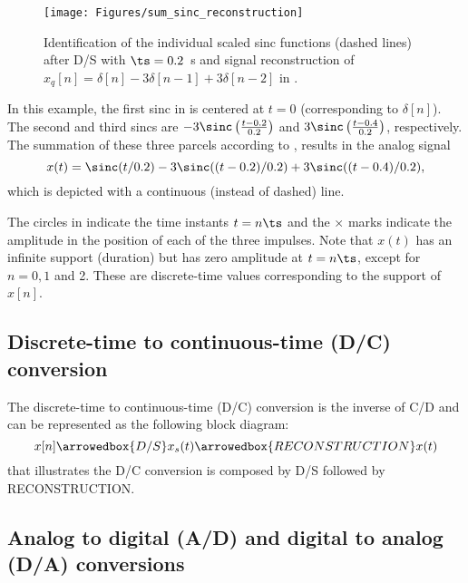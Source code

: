 \begin{figure}
	\centering
		\texttt{[image: Figures/sum\_sinc\_reconstruction]}
	\caption{Identification of the individual scaled sinc functions (dashed lines) after D/S with $\ts=0.2$~s and signal reconstruction of $x_q[n]=\delta[n]-3\delta[n-1]+3\delta[n-2]$ in .\label{fig:sum_sinc_reconstruction}}
\end{figure}

In this example, the first sinc in  is centered at $t=0$ (corresponding to $\delta[n]$). The second and third sincs
 are $-3\sinc \left( \frac{t-0.2}{0.2}\right)$ and $3\sinc \left( \frac{t-0.4}{0.2}\right)$, respectively. The summation of these three parcels according to , results in the analog signal 
\begin{equation}
x(t) = \sinc(t/0.2) - 3\sinc((t-0.2)/0.2) + 3 \sinc((t-0.4)/0.2),
\label{eq:three_sincs}
\end{equation}
which is depicted with a continuous (instead of dashed) line.

The circles in  indicate the time instants $t=n \ts$ and the $\times$ marks indicate the amplitude in the position of each of the three impulses.
Note that $x(t)$ has an infinite support (duration) but has zero amplitude at $t=n \ts$, except for $n=0, 1$ and 2. These are discrete-time values corresponding to the support of $x[n]$.
\eExample 


\subsection{Discrete-time to continuous-time (D/C) conversion}
\label{sec:dc_conversion}

The discrete-time to continuous-time (D/C) conversion is the inverse of C/D and can be represented as
the following block diagram:
\[x[n] \arrowedbox{D/S} x_{s}(t) \arrowedbox{RECONSTRUCTION} x(t)\]
that illustrates the D/C conversion is composed by D/S followed by RECONSTRUCTION.


\subsection{Analog to digital (A/D) and digital to analog (D/A) conversions}

